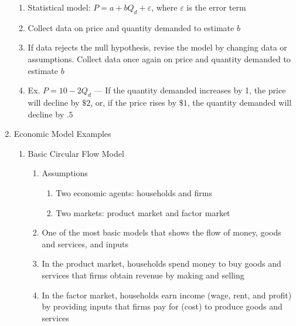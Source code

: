 \documentclass[12pt]{article}
\begin{document}
\begin{enumerate}
\begin{enumerate}
          \item Statistical model: $P=a+bQ_d+\varepsilon$, where $\varepsilon$ is the error term

          \item Collect data on price and quantity demanded to estimate $b$

          \item If data rejects the null hypothesis, revise the model by changing data or assumptions. Collect data once again on price and quantity demanded to estimate $b$

          \item Ex. $P=10-2Q_d$ — If the quantity demanded increases by 1, the price will decline by $\$ 2$, or, if the price rises by $\$ 1$, the quantity demanded will decline by $.5$

        \end{enumerate}

      \item Economic Model Examples

        \begin{enumerate}

          \item Basic Circular Flow Model

            \begin{enumerate}

              \item Assumptions

                \begin{enumerate}

                  \item Two economic agents: households and firms

                  \item Two markets: product market and factor market

                \end{enumerate}

              \item One of the most basic models that shows the flow of money, goods and services, and inputs

              \item In the product market, households spend money to buy goods and services that firms obtain revenue by making and selling

              \item In the factor market, households earn income (wage, rent, and profit) by providing inputs that firms pay for (cost) to produce goods and services


\end{enumerate}
\end{enumerate}
\end{enumerate}
\end{document}
